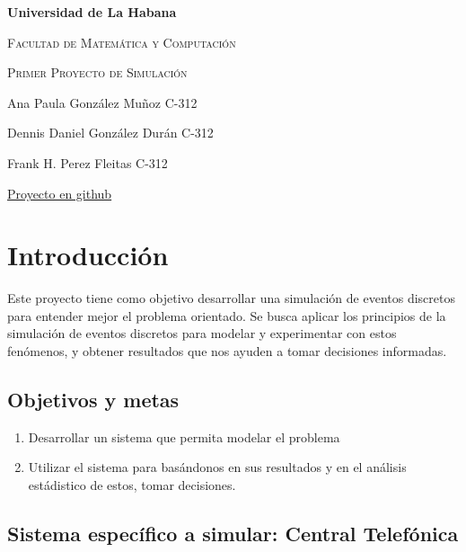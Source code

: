 \documentclass{article}
\begin{document}
	
	\begin{titlepage}
		\centering
		{\bfseries\LARGE Universidad de La Habana \par}
		\vspace{1cm}
		{\scshape\Large Facultad de Matemática y Computación \par}
		\vspace{3cm}
		{\scshape\Huge Primer Proyecto de Simulación \par}
		\vfill
		
		{\Large Ana Paula González Muñoz C-312 \par}
		{\Large Dennis Daniel González Durán C-312 \par}
		{\Large Frank H. Perez Fleitas C-312 \par}
		\vfill
		{\href{https://github.com/anamunnoz/Simulation-Project-I}{Proyecto en github} \par}
	\end{titlepage}


	\section*{Introducción}
	Este proyecto tiene como objetivo desarrollar una simulación de eventos discretos para entender mejor el problema orientado. Se busca aplicar los principios de la simulación de eventos discretos para modelar y experimentar con estos fenómenos, y obtener resultados que nos ayuden a tomar decisiones informadas.
	
	\subsection*{Objetivos y metas}
	\begin{enumerate}
		\item  Desarrollar un sistema que permita modelar el problema
		\item Utilizar el sistema para basándonos en sus resultados y en el análisis estádistico de estos, tomar decisiones.
		\end{enumerate}
	
	\subsection*{Sistema específico a simular: Central Telefónica}
	
\end{document}
